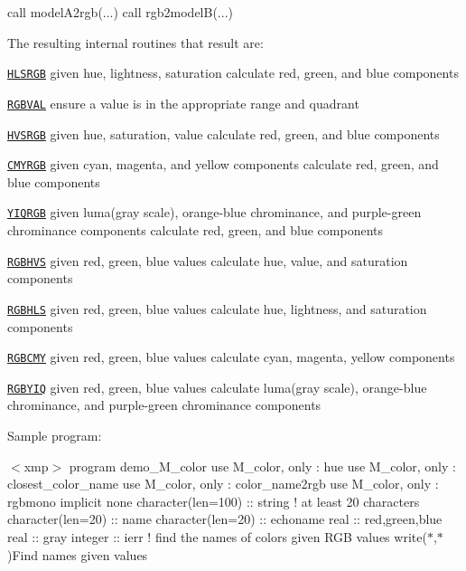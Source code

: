 \begin{DoxyDescription}
\begin{DoxyPre}
     call modelA2rgb(...)
     call rgb2modelB(...)
 \end{DoxyPre}




The resulting internal routines that result are\+: 




\begin{DoxyItemize}
\item \href{#HLSRGB}{\tt H\+L\+S\+R\+GB} given hue, lightness, saturation calculate red, green, and blue components 
\begin{DoxyItemize}
\item \href{#RGBVAL}{\tt R\+G\+B\+V\+AL} ensure a value is in the appropriate range and quadrant  
\end{DoxyItemize}
\item \href{#HVSRGB}{\tt H\+V\+S\+R\+GB} given hue, saturation, value calculate red, green, and blue components  
\item \href{#CMYRGB}{\tt C\+M\+Y\+R\+GB} given cyan, magenta, and yellow components calculate red, green, and blue components  
\item \href{#YIQRGB}{\tt Y\+I\+Q\+R\+GB} given luma(gray scale), orange-\/blue chrominance, and purple-\/green chrominance components calculate red, green, and blue components 


\item \href{#RGBHVS}{\tt R\+G\+B\+H\+VS} given red, green, blue values calculate hue, value, and saturation components  
\item \href{#RGBHLS}{\tt R\+G\+B\+H\+LS} given red, green, blue values calculate hue, lightness, and saturation components  
\item \href{#RGBCMY}{\tt R\+G\+B\+C\+MY} given red, green, blue values calculate cyan, magenta, yellow components  
\item \href{#RGBYIQ}{\tt R\+G\+B\+Y\+IQ} given red, green, blue values calculate luma(gray scale), orange-\/blue chrominance, and purple-\/green chrominance components 


\end{DoxyItemize}
\item[E\+X\+A\+M\+P\+LE ]

Sample program\+: 

$<$xmp$>$ program demo\+\_\+\+M\+\_\+color use M\+\_\+color, only \+: hue use M\+\_\+color, only \+: closest\+\_\+color\+\_\+name use M\+\_\+color, only \+: color\+\_\+name2rgb use M\+\_\+color, only \+: rgbmono implicit none character(len=100) \+:\+: string ! at least 20 characters character(len=20) \+:\+: name character(len=20) \+:\+: echoname real \+:\+: red,green,blue real \+:\+: gray integer \+:\+: ierr ! find the names of colors given R\+GB values write($\ast$,$\ast$)\textquotesingle{}Find names given values\textquotesingle{}


\end{DoxyDescription}
